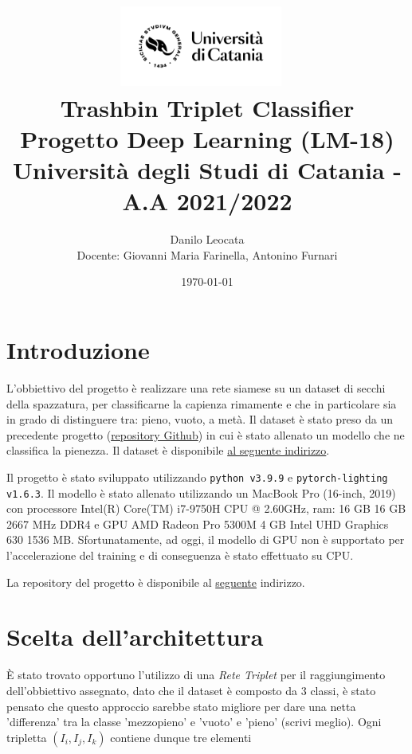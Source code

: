 \documentclass[11pt]{article}
\title{ %
\includegraphics[width=0.4\textwidth]{UniCT-Logo-Nero}~\\
Trashbin Triplet Classifier \\ 
\large Progetto Deep Learning (LM-18) \\ Università degli Studi di Catania - A.A 2021/2022 \\
}
\author{ Danilo Leocata \\ Docente: Giovanni Maria Farinella, Antonino Furnari}
\date{\today}
\begin{document}
\maketitle	
\pagebreak


\section{Introduzione}

L'obbiettivo del progetto è realizzare una rete siamese su un dataset di secchi della spazzatura, per classificarne la capienza rimamente e che in particolare sia in grado di distinguere tra: pieno, vuoto, a metà.
Il dataset è stato preso da un precedente progetto (\href{https://github.com/khalld/trashbin-classifier}{repository Github}) in cui è stato allenato un modello che ne classifica la pienezza. Il dataset è disponibile \href{https://drive.google.com/drive/folders/11SGtZrM8BWJDPOcnKR7RjLJs0dJOfSCA?usp=sharing}{al seguente indirizzo}.

Il progetto è stato sviluppato utilizzando \texttt{python v3.9.9} e \texttt{pytorch-lighting v1.6.3}. Il modello è stato allenato utilizzando un MacBook Pro (16-inch, 2019) con processore Intel(R) Core(TM) i7-9750H CPU @ 2.60GHz, ram: 16 GB 16 GB 2667 MHz DDR4 e GPU AMD Radeon Pro 5300M 4 GB
Intel UHD Graphics 630 1536 MB. Sfortunatamente, ad oggi, il modello di GPU non è supportato per l'accelerazione del training e di conseguenza è stato effettuato su CPU.

La repository del progetto è disponibile al \href{https://github.com/khalld/triplet-trashbin-classifier}{seguente} indirizzo.

\section{Scelta dell'architettura}

È stato trovato opportuno l'utilizzo di una \textit{Rete Triplet} per il raggiungimento dell'obbiettivo assegnato, dato che il dataset è composto da 3 classi, è stato pensato che questo approccio sarebbe stato migliore per dare una netta 'differenza' tra la classe 'mezzopieno' e 'vuoto' e 'pieno' (scrivi meglio).
Ogni tripletta $(I_i, I_j, I_k)$ contiene dunque tre elementi
\end{document}
